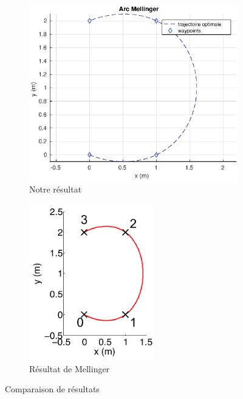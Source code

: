 \begin{figure}[h]
\centering
\begin{subfigure}{.4\textwidth}
  \centering
  \includegraphics[width=\textwidth]{fig/arc_mellinger}
  \caption{Notre résultat}
\end{subfigure}%
\begin{subfigure}{.4\textwidth}
  \centering
  \includegraphics[width=0.6\textwidth]{fig/arc_mellinger_orig.png}
  \caption{Résultat de Mellinger \cite{Mellinger2011}}
  \label{fig:sub2}
\end{subfigure}
\caption{Comparaison de résultats}
\label{fig:comparaison}
\end{figure}

